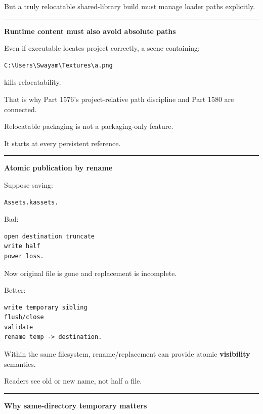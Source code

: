 But a truly relocatable shared-library build must manage loader paths explicitly.

\begin{center}\rule{0.5\linewidth}{0.5pt}\end{center}

\textbf{Runtime content must also avoid absolute paths}

Even if executable locates project correctly, a scene containing:

\begin{verbatim}
C:\Users\Swayam\Textures\a.png
\end{verbatim}

kills relocatability.

That is why Part 1576's project-relative path discipline and Part 1580 are connected.

Relocatable packaging is not a packaging-only feature.

It starts at every persistent reference.

\begin{center}\rule{0.5\linewidth}{0.5pt}\end{center}

\textbf{Atomic publication by rename}

Suppose saving:

\begin{verbatim}
Assets.kassets.
\end{verbatim}

Bad:

\begin{verbatim}
open destination truncate
write half
power loss.
\end{verbatim}

Now original file is gone and replacement is incomplete.

Better:

\begin{verbatim}
write temporary sibling
flush/close
validate
rename temp -> destination.
\end{verbatim}

Within the same filesystem, rename/replacement can provide atomic \textbf{visibility} semantics.

Readers see old or new name, not half a file.

\begin{center}\rule{0.5\linewidth}{0.5pt}\end{center}

\textbf{Why same-directory temporary matters}

